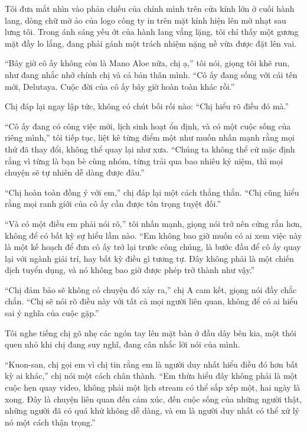 \documentclass[../main.tex]{subfiles}
\begin{document}
Tôi đưa mắt nhìn vào phản chiếu của chính mình trên cửa kính lớn ở cuối hành lang, dòng chữ mờ ảo của logo công ty in trên mặt kính hiện lên mờ nhạt sau lưng tôi. Trong ánh sáng yếu ớt của hành lang vắng lặng, tôi chỉ thấy một gương mặt đầy lo lắng, đang phải gánh một trách nhiệm nặng nề vừa được đặt lên vai.

``Bây giờ cô ấy không còn là Mano Aloe nữa, chị ạ,'' tôi nói, giọng tôi khẽ run, như đang nhắc nhở chính chị và cả bản thân mình. ``Cô ấy đang sống với cái tên mới, Delutaya. Cuộc đời của cô ấy bây giờ hoàn toàn khác rồi.''

Chị đáp lại ngay lập tức, không có chút bối rối nào: ``Chị hiểu rõ điều đó mà.''

``Cô ấy đang có công việc mới, lịch sinh hoạt ổn định, và có một cuộc sống của riêng mình,'' tôi tiếp tục, liệt kê từng điểm một như muốn nhấn mạnh rằng mọi thứ đã thay đổi, không thể quay lại như xưa. ``Chúng ta không thể cứ mặc định rằng vì từng là bạn bè cùng nhóm, từng trải qua bao nhiêu kỷ niệm, thì mọi chuyện sẽ tự nhiên dễ dàng được đâu.''

``Chị hoàn toàn đồng ý với em,'' chị đáp lại một cách thẳng thắn. ``Chị cũng hiểu rằng mọi ranh giới của cô ấy cần được tôn trọng tuyệt đối.''

``Và có một điều em phải nói rõ,'' tôi nhấn mạnh, giọng nói trở nên cứng rắn hơn, không để có bất kỳ sự hiểu lầm nào. ``Em không bao giờ muốn có ai xem việc này là một kế hoạch để đưa cô ấy trở lại trước công chúng, là bước đầu để cô ấy quay lại với ngành giải trí, hay bất kỳ điều gì tương tự. Đây không phải là một chiến dịch tuyển dụng, và nó không bao giờ được phép trở thành như vậy.''

``Chị đảm bảo sẽ không có chuyện đó xảy ra,'' chị A cam kết, giọng nói đầy chắc chắn. ``Chị sẽ nói rõ điều này với tất cả mọi người liên quan, không để có ai hiểu sai ý nghĩa của cuộc gặp.''

Tôi nghe tiếng chị gõ nhẹ các ngón tay lên mặt bàn ở đầu dây bên kia, một thói quen nhỏ khi chị đang suy nghĩ, đang cân nhắc lời nói của mình.

``Kuon-san, chị gọi em vì chị tin rằng em là người duy nhất hiểu điều đó hơn bất kỳ ai khác,'' chị nói một cách chân thành. ``Em thừa hiểu đây không phải là một cuộc hẹn quay video, không phải một lịch stream có thể sắp xếp một, hai ngày là xong. Đây là chuyện liên quan đến cảm xúc, đến cuộc sống của những người thật, những người đã có quá khứ không dễ dàng, và em là người duy nhất có thể xử lý nó một cách thận trọng.''
\end{document}
